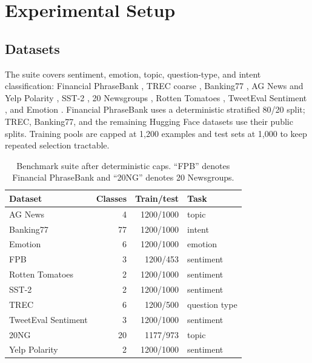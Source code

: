 \documentclass[conference]{IEEEtran}
\begin{document}
\section{Experimental Setup}

\subsection{Datasets}
The suite covers sentiment, emotion, topic, question-type, and intent classification: Financial PhraseBank \cite{malo2014good}, TREC coarse \cite{li2002learning}, Banking77 \cite{casanueva2020efficient}, AG News and Yelp Polarity \cite{zhang2015character}, SST-2 \cite{socher2013recursive}, 20 Newsgroups \cite{lang1995newsweeder}, Rotten Tomatoes \cite{pang2005seeing}, TweetEval Sentiment \cite{barbieri2020tweeteval}, and Emotion \cite{saravia2018carer}. Financial PhraseBank uses a deterministic stratified 80/20 split; TREC, Banking77, and the remaining Hugging Face datasets use their public splits. Training pools are capped at 1,200 examples and test sets at 1,000 to keep repeated selection tractable.

\begin{table}[t]
\caption{Benchmark suite after deterministic caps. ``FPB'' denotes Financial PhraseBank and ``20NG'' denotes 20 Newsgroups.}
\label{tab:datasets}
\centering
\footnotesize
\begin{tabular}{lrrl}
\toprule
Dataset & Classes & Train/test & Task \\
\midrule
AG News & 4 & 1200/1000 & topic \\
Banking77 & 77 & 1200/1000 & intent \\
Emotion & 6 & 1200/1000 & emotion \\
FPB & 3 & 1200/453 & sentiment \\
Rotten Tomatoes & 2 & 1200/1000 & sentiment \\
SST-2 & 2 & 1200/1000 & sentiment \\
TREC & 6 & 1200/500 & question type \\
TweetEval Sentiment & 3 & 1200/1000 & sentiment \\
20NG & 20 & 1177/973 & topic \\
Yelp Polarity & 2 & 1200/1000 & sentiment \\
\bottomrule
\end{tabular}
\end{table}
\end{document}
